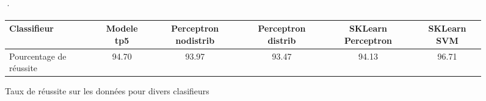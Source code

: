  \begin{figure}[H] ·\centering \begin{tabular}{ |l|| *{5}{c|} }\hline
Classifieur   & Modele tp5 & Perceptron nodistrib & Perceptron distrib & SKLearn Perceptron & SKLearn SVM \\ \hline Pourcentage de réussite   & 94.70 & 93.97 & 93.47 & 94.13 & 96.71 \\ \hline  \end{tabular} \caption{Taux de réussite sur les données pour divers clasifieurs} \end{figure}